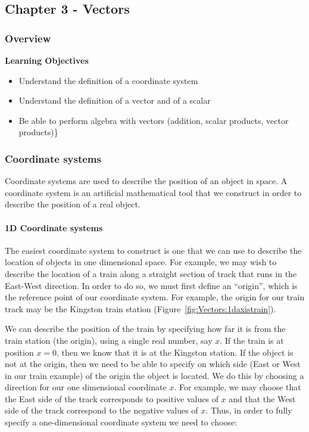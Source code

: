 \subsection{Chapter 3 - Vectors}

\subsubsection{Overview}\label{chap:vectors}

\begin{framed}
\textbf{Learning Objectives}\\
\begin{itemize}
\item Understand the definition of a coordinate system
\item Understand the definition of a vector and of a scalar
\item Be able to perform algebra with vectors (addition, scalar products, vector products)\}
\end{itemize}
\end{framed}

\subsubsection{Coordinate systems}

Coordinate systems are used to describe the position of an object in space. A coordinate system is an artificial mathematical tool that we construct in order to describe the position of a real object.

\paragraph{1D Coordinate systems}

The easiest coordinate system to construct is one that we can use to describe the location of objects in one dimensional space. For example, we may wish to describe the location of a train along a straight section of track that runs in the East-West direction. In order to do so, we must first define an ``origin'', which is the reference point of our coordinate system. For example, the origin for our train track may be the Kingston train station (Figure~\ref{fig:Vectors:1daxistrain}).

We can describe the position of the train by specifying how far it is from the train station (the origin), using a single real number, say $x$. If the train is at position $x=0$, then we know that it is at the Kingston station. If the object is not at the origin, then we need to be able to specify on which side (East or West in our train example) of the origin the object is located. We do this by choosing a direction for our one dimensional coordinate $x$. For example, we may choose that the East side of the track corresponds to positive values of $x$ and that the West side of the track correspond to the negative values of $x$. Thus, in order to fully specify a one-dimensional coordinate system we need to choose:

